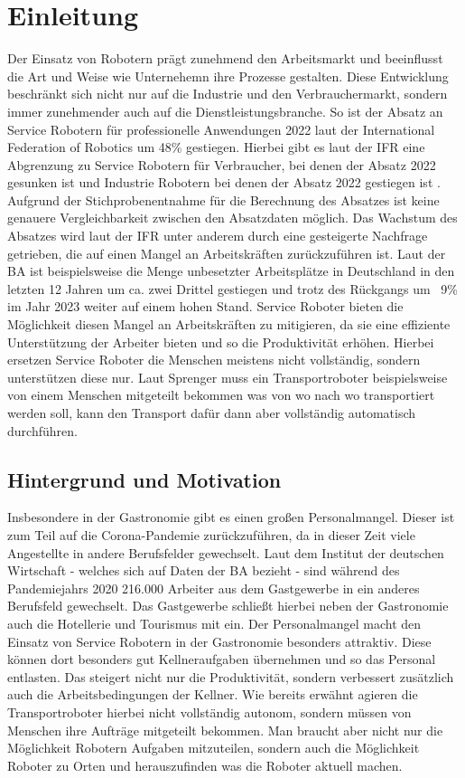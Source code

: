 \section{Einleitung}
Der Einsatz von Robotern prägt zunehmend den Arbeitsmarkt und beeinflusst die Art und Weise wie Unternehemn ihre Prozesse gestalten. Diese Entwicklung beschränkt sich nicht nur auf die Industrie und den Verbrauchermarkt, sondern immer zunehmender auch auf die Dienstleistungsbranche. So ist der Absatz an Service Robotern für professionelle Anwendungen 2022 laut der International Federation of Robotics \cite{IFR2023} um 48\% gestiegen. Hierbei gibt es laut der \ac{IFR} eine Abgrenzung zu Service Robotern für Verbraucher, bei denen der Absatz 2022 gesunken ist \cite[S.~37]{WorldRobotics2023} und Industrie Robotern bei denen der Absatz 2022 gestiegen ist \cite[S.~9]{WorldRobotics2023}. Aufgrund der Stichprobenentnahme für die Berechnung des Absatzes ist keine genauere Vergleichbarkeit zwischen den Absatzdaten möglich. Das Wachstum des Absatzes wird laut der \ac{IFR} \cite[S.~36]{WorldRobotics2023} unter anderem durch eine gesteigerte Nachfrage getrieben, die auf einen Mangel an Arbeitskräften zurückzuführen ist. Laut der \ac{BA} \cite{BA2024} ist beispielsweise die Menge unbesetzter Arbeitsplätze in Deutschland in den letzten 12 Jahren um ca. zwei Drittel gestiegen und trotz des Rückgangs um ~9\% im Jahr 2023 weiter auf einem hohen Stand. Service Roboter bieten die Möglichkeit diesen Mangel an Arbeitskräften zu mitigieren, da sie eine effiziente Unterstützung der Arbeiter bieten und so die Produktivität erhöhen. Hierbei ersetzen Service Roboter die Menschen meistens nicht vollständig, sondern unterstützen diese nur. Laut Sprenger \cite[S.~272]{Sprenger2015} muss ein Transportroboter beispielsweise von einem Menschen mitgeteilt bekommen was von wo nach wo transportiert werden soll, kann den Transport dafür dann aber vollständig automatisch durchführen.

\subsection{Hintergrund und Motivation}
Insbesondere in der Gastronomie gibt es einen großen Personalmangel. Dieser ist zum Teil auf die Corona-Pandemie zurückzuführen, da in dieser Zeit viele Angestellte in andere Berufsfelder gewechselt. Laut dem Institut der deutschen Wirtschaft \cite{BA2024} - welches sich auf Daten der \ac{BA} bezieht - sind während des Pandemiejahrs 2020 216.000 Arbeiter aus dem Gastgewerbe in ein anderes Berufsfeld gewechselt. Das Gastgewerbe schließt hierbei neben der Gastronomie auch die Hotellerie und Tourismus mit ein. Der Personalmangel macht den Einsatz von Service Robotern in der Gastronomie besonders attraktiv. Diese können dort besonders gut Kellneraufgaben übernehmen und so das Personal entlasten. Das steigert nicht nur die Produktivität, sondern verbessert zusätzlich auch die Arbeitsbedingungen der Kellner. Wie bereits erwähnt agieren die Transportroboter hierbei nicht vollständig autonom, sondern müssen von Menschen ihre Aufträge mitgeteilt bekommen. Man braucht aber nicht nur die Möglichkeit Robotern Aufgaben mitzuteilen, sondern auch die Möglichkeit Roboter zu Orten und herauszufinden was die Roboter aktuell machen.

